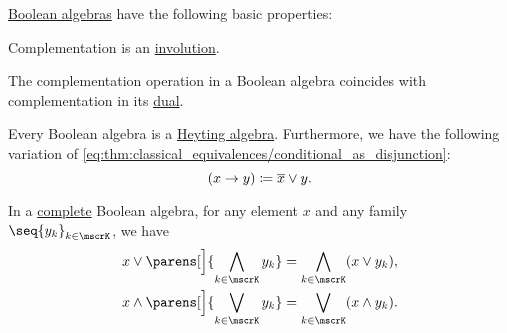 \begin{proposition}\label{thm:def:boolean_algebra}
  \hyperref[def:boolean_algebra]{Boolean algebras} have the following basic properties:
  \begin{thmenum}
     Complementation is an \hyperref[def:morphism_invertibility/involution]{involution}.

     The complementation operation in a Boolean algebra coincides with complementation in its \hyperref[def:boolean_algebra/opposite]{dual}.

     Every Boolean algebra is a \hyperref[def:heyting_algebra]{Heyting algebra}. Furthermore, we have the following variation of \eqref{eq:thm:classical_equivalences/conditional_as_disjunction}:
    \begin{equation*}
      (x \rightarrow y) \coloneqq \oline {x} \vee y.
    \end{equation*}

     In a \hyperref[def:complete_lattice]{complete} Boolean algebra, for any element \( x \) and any family \( \seq{ y_k }_{k \in \mscrK} \), we have
    \begin{align}
      x \vee \parens[\Big]{ \bigwedge_{k \in \mscrK} y_k } &= \bigwedge_{k \in \mscrK} (x \vee y_k), \label{eq:thm:def:boolean_algebra/distributive/join_over_meet} \\
      x \wedge \parens[\Big]{ \bigvee_{k \in \mscrK} y_k } &= \bigvee_{k \in \mscrK} (x \wedge y_k). \label{eq:thm:def:boolean_algebra/distributive/meet_over_join}
    \end{align}
  \end{thmenum}
\end{proposition}

